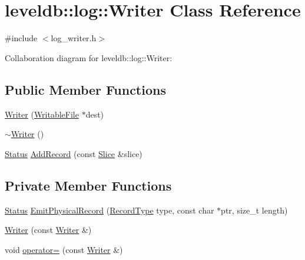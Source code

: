 \hypertarget{classleveldb_1_1log_1_1_writer}{\section{leveldb\-:\-:log\-:\-:Writer Class Reference}
\label{classleveldb_1_1log_1_1_writer}
}


{\ttfamily \#include $<$log\-\_\-writer.\-h$>$}



Collaboration diagram for leveldb\-:\-:log\-:\-:Writer\-:
\subsection*{Public Member Functions}
\begin{DoxyCompactItemize}
\item 
\hyperlink{classleveldb_1_1log_1_1_writer_a424f67be4485fdf3ef8ba55c9c559c90}{Writer} (\hyperlink{classleveldb_1_1_writable_file}{Writable\-File} $\ast$dest)
\item 
\hyperlink{classleveldb_1_1log_1_1_writer_a71bcdee2a87eb535fd60a3fe047e66be}{$\sim$\-Writer} ()
\item 
\hyperlink{classleveldb_1_1_status}{Status} \hyperlink{classleveldb_1_1log_1_1_writer_acb4abda5a5348ac1771657ff01bf2fad}{Add\-Record} (const \hyperlink{classleveldb_1_1_slice}{Slice} \&slice)
\end{DoxyCompactItemize}
\subsection*{Private Member Functions}
\begin{DoxyCompactItemize}
\item 
\hyperlink{classleveldb_1_1_status}{Status} \hyperlink{classleveldb_1_1log_1_1_writer_a0ca13201d9f4aa2231a1144bad4f1908}{Emit\-Physical\-Record} (\hyperlink{namespaceleveldb_1_1log_a01bdc1b51beb634f14f8fbb70fbd8d2a}{Record\-Type} type, const char $\ast$ptr, size\-\_\-t length)
\item 
\hyperlink{classleveldb_1_1log_1_1_writer_a89df944ee585c726563eb3deb43a24cc}{Writer} (const \hyperlink{classleveldb_1_1log_1_1_writer}{Writer} \&)
\item 
void \hyperlink{classleveldb_1_1log_1_1_writer_a26d4fb5471d0e17bb17a8b644279a3c3}{operator=} (const \hyperlink{classleveldb_1_1log_1_1_writer}{Writer} \&)
\end{DoxyCompactItemize}
